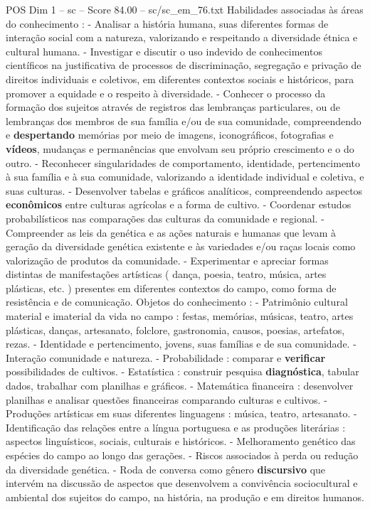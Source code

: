 \begin{textsample}{POS Dim 1 – sc – Score 84.00 – sc/sc\_em\_76.txt}
Habilidades associadas às áreas do conhecimento : - Analisar a história humana, suas diferentes formas de interação social com a natureza, valorizando e respeitando a diversidade étnica e cultural humana. - Investigar e discutir o uso indevido de conhecimentos científicos na justificativa de processos de discriminação, segregação e privação de direitos individuais e coletivos, em diferentes contextos sociais e históricos, para promover a equidade e o respeito à diversidade. - Conhecer o processo da formação dos sujeitos através de registros das lembranças particulares, ou de lembranças dos membros de sua família e/ou de sua comunidade, compreendendo e \textbf{despertando} memórias por meio de imagens, iconográficos, fotografias e \textbf{vídeos}, mudanças e permanências que envolvam seu próprio crescimento e o do outro. - Reconhecer singularidades de comportamento, identidade, pertencimento à sua família e à sua comunidade, valorizando a identidade individual e coletiva, e suas culturas. - Desenvolver tabelas e gráficos analíticos, compreendendo aspectos \textbf{econômicos} entre culturas agrícolas e a forma de cultivo. - Coordenar estudos probabilísticos nas comparações das culturas da comunidade e regional. - Compreender as leis da genética e as ações naturais e humanas que levam à geração da diversidade genética existente e às variedades e/ou raças locais como valorização de produtos da comunidade. - Experimentar e apreciar formas distintas de manifestações artísticas ( dança, poesia, teatro, música, artes plásticas, etc. ) presentes em diferentes contextos do campo, como forma de resistência e de comunicação.
Objetos do conhecimento : - Patrimônio cultural material e imaterial da vida no campo : festas, memórias, músicas, teatro, artes plásticas, danças, artesanato, folclore, gastronomia, causos, poesias, artefatos, rezas. - Identidade e pertencimento, jovens, suas famílias e de sua comunidade. - Interação comunidade e natureza. - Probabilidade : comparar e \textbf{verificar} possibilidades de cultivos. - Estatística : construir pesquisa \textbf{diagnóstica}, tabular dados, trabalhar com planilhas e gráficos. - Matemática financeira : desenvolver planilhas e analisar questões financeiras comparando culturas e cultivos. - Produções artísticas em suas diferentes linguagens : música, teatro, artesanato. - Identificação das relações entre a língua portuguesa e as produções literárias : aspectos linguísticos, sociais, culturais e históricos. - Melhoramento genético das espécies do campo ao longo das gerações. - Riscos associados à perda ou redução da diversidade genética. - Roda de conversa como gênero \textbf{discursivo} que intervém na discussão de aspectos que desenvolvem a convivência sociocultural e ambiental dos sujeitos do campo, na história, na produção e em direitos humanos.

\end{textsample}

